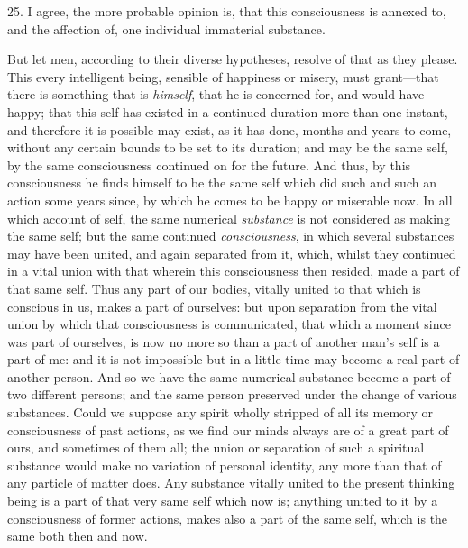 25. I agree, the more probable opinion is, that this consciousness is
annexed to, and the affection of, one individual immaterial substance.

But let men, according to their diverse hypotheses, resolve of that as
they please. This every intelligent being, sensible of happiness or
misery, must grant---that there is something that  is
\textit{himself}, that he is concerned for, and would have happy; that
this self has existed in a continued duration more than one instant,
and therefore it is possible may exist, as it has done, months and
years to come, without any certain bounds to be set to its duration;
and may be the same self, by the same consciousness continued on for
the future. And thus, by this consciousness he finds himself to be the
same self which did such and such an action some years since, by which
he comes to be happy or miserable now. In all which account of self,
the same numerical \textit{substance} is not considered as making the
same self; but the same continued \textit{consciousness}, in which
several substances may have been united, and again separated from it,
which, whilst they continued in a vital union with that wherein this
consciousness then resided, made a part of that same self. Thus any
part of our bodies, vitally united to that which is conscious in us,
makes a part of ourselves: but upon separation from the vital union by
which that consciousness is communicated, that which a moment since
was part of ourselves, is now no more so than a part of another man's
self is a part of me: and it is not impossible but in a little time
may become a real part of another person. And so we have the same
numerical substance become a part of two different persons; and the
same person preserved under the change of various substances. Could we
suppose any spirit wholly stripped of all its memory or consciousness
of past actions, as we find our minds always are of a great part of
ours, and sometimes of them all; the union or separation of such a
spiritual substance would make no variation of personal identity, any
more than that of any particle of matter does. Any substance vitally
united to the present thinking being is a part of that very same self
which now is; anything united to it by a consciousness of former
actions, makes also a part of the same self, which is the same both
then and now.

